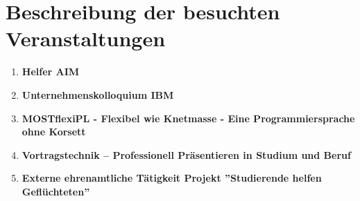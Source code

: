 \documentclass[a4paper, 12pt]{scrartcl} %
\begin{document}
\section{Beschreibung der besuchten Veranstaltungen}
\begin{enumerate}
\item\textbf{Helfer AIM}\par

\vspace{0.5cm}
\item\textbf{Unternehmenskolloquium IBM}\par

\vspace{0.5cm}
\item\textbf{MOSTflexiPL - Flexibel wie Knetmasse - Eine Programmiersprache ohne Korsett}\par

\vspace{0.5cm}
\item\textbf{Vortragstechnik – Professionell Präsentieren in Studium und Beruf}\par

\vspace{0.5cm}
\item\textbf{Externe ehrenamtliche Tätigkeit Projekt ''Studierende helfen Geflüchteten''}\par


\end{enumerate}
\end{document}
